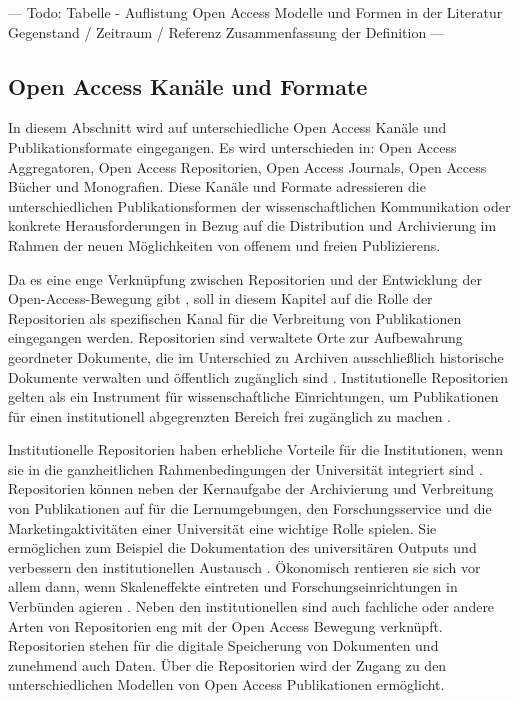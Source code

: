 --- Todo: Tabelle - Auflistung Open Access  Modelle und Formen in der Literatur
Gegenstand / Zeitraum / Referenz
Zusammenfassung der Definition ---

\subsection{Open Access Kanäle und Formate}
In diesem Abschnitt wird auf unterschiedliche Open Access Kanäle und Publikationsformate eingegangen. Es wird unterschieden in: Open Access Aggregatoren, Open Access Repositorien, Open Access Journals, Open Access Bücher und Monografien. Diese Kanäle und Formate adressieren die unterschiedlichen Publikationsformen der wissenschaftlichen Kommunikation oder konkrete Herausforderungen in Bezug auf die Distribution und Archivierung im Rahmen der neuen Möglichkeiten von offenem und freien Publizierens.

Da es eine enge Verknüpfung zwischen Repositorien und der Entwicklung der Open-Access-Bewegung gibt \cite{offhaus_2012_institutionelle_repos}, soll in diesem Kapitel auf die Rolle der Repositorien als spezifischen Kanal für die Verbreitung von Publikationen eingegangen werden. Repositorien sind verwaltete Orte zur Aufbewahrung geordneter Dokumente, die im Unterschied zu Archiven ausschließlich historische Dokumente verwalten und öffentlich zugänglich sind \cite{suchen}. Institutionelle Repositorien gelten als ein Instrument für wissenschaftliche Einrichtungen, um Publikationen für einen institutionell abgegrenzten Bereich frei zugänglich zu machen \cite{dobratz_2007_open}.

Institutionelle Repositorien haben erhebliche Vorteile für die Institutionen, wenn sie in die ganzheitlichen Rahmenbedingungen der Universität integriert sind \cite{steele_2006}. Repositorien können neben der Kernaufgabe der Archivierung und Verbreitung von Publikationen auf für die Lernumgebungen, den Forschungsservice und die Marketingaktivitäten einer Universität eine wichtige Rolle spielen. Sie ermöglichen zum Beispiel die Dokumentation des universitären Outputs und verbessern den institutionellen Austausch \cite{steele_2006}. Ökonomisch rentieren sie sich vor allem dann, wenn Skaleneffekte eintreten und Forschungseinrichtungen in Verbünden agieren \cite{blythe_2005value}. Neben den institutionellen sind auch fachliche oder andere Arten von Repositorien eng mit der Open Access Bewegung verknüpft. Repositorien stehen  für die digitale Speicherung von Dokumenten und zunehmend auch Daten. Über die Repositorien wird der Zugang zu den unterschiedlichen Modellen von Open Access Publikationen ermöglicht.


